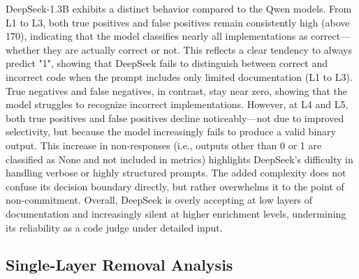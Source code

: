 \documentclass[a4paper]{usiinfbachelorproject}
\begin{document}
\noindent
DeepSeek-1.3B exhibits a distinct behavior compared to the Qwen models. From L1 to L3, both true positives and false positives remain consistently high (above 170), indicating that the model classifies nearly all implementations as correct—whether they are actually correct or not. This reflects a clear tendency to always predict "1", showing that DeepSeek fails to distinguish between correct and incorrect code when the prompt includes only limited documentation (L1 to L3). True negatives and false negatives, in contrast, stay near zero, showing that the model struggles to recognize incorrect implementations. However, at L4 and L5, both true positives and false positives decline noticeably—not due to improved selectivity, but because the model increasingly fails to produce a valid binary output. This increase in non-responses (i.e., outputs other than 0 or 1 are classified as None and not included in metrics) highlights DeepSeek’s difficulty in handling verbose or highly structured prompts. The added complexity does not confuse its decision boundary directly, but rather overwhelms it to the point of non-commitment. Overall, DeepSeek is overly accepting at low layers of documentation and increasingly silent at higher enrichment levels, undermining its reliability as a code judge under detailed input.

\subsection{Single-Layer Removal Analysis}
\end{document}
